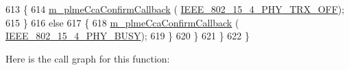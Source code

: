 \begin{DoxyCode}
613             \{
614               \hyperlink{classns3_1_1LrWpanPhy_a3b75b533222419589c396380e8305bb9}{m\_plmeCcaConfirmCallback} (
      \hyperlink{group__lr-wpan_gga6494269d13d45c511a07b7ccbb1de754a4c0fd3882b68301deb8ce5b03109058f}{IEEE\_802\_15\_4\_PHY\_TRX\_OFF});
615             \}
616           \textcolor{keywordflow}{else}
617             \{
618               \hyperlink{classns3_1_1LrWpanPhy_a3b75b533222419589c396380e8305bb9}{m\_plmeCcaConfirmCallback} (
      \hyperlink{group__lr-wpan_gga6494269d13d45c511a07b7ccbb1de754a14641e5190b66ec8ec3903218058dc46}{IEEE\_802\_15\_4\_PHY\_BUSY});
619             \}
620         \}
621     \}
622 \}
\end{DoxyCode}


Here is the call graph for this function\+:


